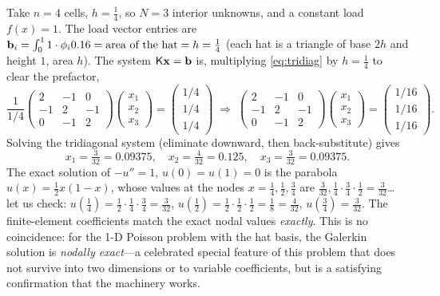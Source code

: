 Take $n=4$ cells, $h=\tfrac14$, so $N=3$ interior unknowns, and a constant load
$f(x)=1$. The load vector entries are
$\mathbf{b}_i=\int_0^1 1\cdot\phi_i0.16=\text{area of the hat}=h=\tfrac14$ (each hat is a
triangle of base $2h$ and height $1$, area $h$). The system $\mathsf{K}\mathbf{x}=\mathbf{b}$ is,
multiplying \cref{eq:tridiag} by $h=\tfrac14$ to clear the prefactor,
\[
\frac1{1/4}
\begin{pmatrix} 2&-1&0\\-1&2&-1\\0&-1&2\end{pmatrix}
\begin{pmatrix}x_1\\x_2\\x_3\end{pmatrix}
=\begin{pmatrix}1/4\\1/4\\1/4\end{pmatrix}
\;\Longrightarrow\;
\begin{pmatrix} 2&-1&0\\-1&2&-1\\0&-1&2\end{pmatrix}
\begin{pmatrix}x_1\\x_2\\x_3\end{pmatrix}
=\begin{pmatrix}1/16\\1/16\\1/16\end{pmatrix}.
\]
Solving the tridiagonal system (eliminate downward, then back-substitute) gives
\[
x_1=\tfrac{3}{32}=0.09375,\quad
x_2=\tfrac{4}{32}=0.125,\quad
x_3=\tfrac{3}{32}=0.09375.
\]
The exact solution of $-u''=1$, $u(0)=u(1)=0$ is the parabola
$u(x)=\tfrac12 x(1-x)$, whose values at the nodes $x=\tfrac14,\tfrac12,\tfrac34$
are $\tfrac{3}{32},\tfrac14\!\cdot\!\tfrac34\!\cdot\!\tfrac12=\tfrac{3}{32}$\dots
let us check: $u(\tfrac14)=\tfrac12\cdot\tfrac14\cdot\tfrac34=\tfrac{3}{32}$,
$u(\tfrac12)=\tfrac12\cdot\tfrac12\cdot\tfrac12=\tfrac18=\tfrac{4}{32}$,
$u(\tfrac34)=\tfrac{3}{32}$. The finite-element coefficients match the exact
nodal values \emph{exactly}. This is no coincidence: for the 1-D Poisson problem
with the hat basis, the Galerkin solution is \emph{nodally exact}---a celebrated
special feature of this problem that does not survive into two dimensions or to
variable coefficients, but is a satisfying confirmation that the machinery works.

